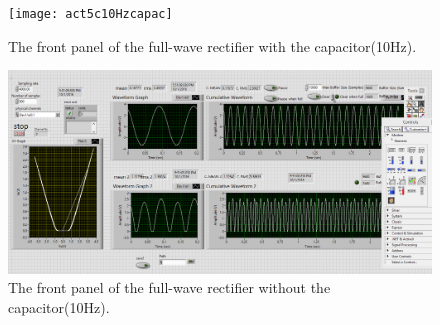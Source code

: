 \documentclass[11pt]{article}
\begin{document}
\begin{figure}[H]
 \begin{center}
  \texttt{[image: act5c10Hzcapac]}
  \caption{The front panel of the full-wave rectifier with the capacitor(10Hz).}
  \label{fig:act5c10Hzcapac}
 \end{center}
\end{figure}

\begin{figure}[H]
 \begin{center}
  \includegraphics[width=\linewidth/1]{act5c10Hznocapac}
  \caption{The front panel of the full-wave rectifier without the capacitor(10Hz).}
  \label{fig:act5c10Hznocapac}
 \end{center}
\end{figure}
\end{document}
